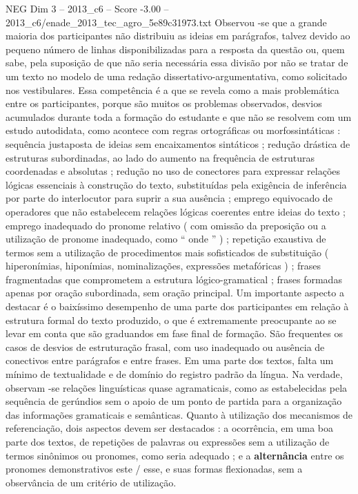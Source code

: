 \begin{textsample}{NEG Dim 3 – 2013\_c6 – Score -3.00 – 2013\_c6/enade\_2013\_tec\_agro\_5e89c31973.txt}
Observou -se que a grande maioria dos participantes não distribuiu as ideias em parágrafos, talvez devido ao pequeno número de linhas disponibilizadas para a resposta da questão ou, quem sabe, pela suposição de que não seria necessária essa divisão por não se tratar de um texto no modelo de uma redação dissertativo-argumentativa, como solicitado nos vestibulares.
Essa competência é a que se revela como a mais problemática entre os participantes, porque são muitos os problemas observados, desvios acumulados durante toda a formação do estudante e que não se resolvem com um estudo autodidata, como acontece com regras ortográficas ou morfossintáticas : sequência justaposta de ideias sem encaixamentos sintáticos ; redução drástica de estruturas subordinadas, ao lado do aumento na frequência de estruturas coordenadas e absolutas ; redução no uso de conectores para expressar relações lógicas essenciais à construção do texto, substituídas pela exigência de inferência por parte do interlocutor para suprir a sua ausência ; emprego equivocado de operadores que não estabelecem relações lógicas coerentes entre ideias do texto ; emprego inadequado do pronome relativo ( com omissão da preposição ou a utilização de pronome inadequado, como “ onde ” ) ; repetição exaustiva de termos sem a utilização de procedimentos mais sofisticados de substituição ( hiperonímias, hiponímias, nominalizações, expressões metafóricas ) ; frases fragmentadas que comprometem a estrutura lógico-gramatical ; frases formadas apenas por oração subordinada, sem oração principal.
Um importante aspecto a destacar é o baixíssimo desempenho de uma parte dos participantes em relação à estrutura formal do texto produzido, o que é extremamente preocupante ao se levar em conta que são graduandos em fase final de formação.
São frequentes os casos de desvios de estruturação frasal, com uso inadequado ou ausência de conectivos entre parágrafos e entre frases.
Em uma parte dos textos, falta um mínimo de textualidade e de domínio do registro padrão da língua.
Na verdade, observam -se relações linguísticas quase agramaticais, como as estabelecidas pela sequência de gerúndios sem o apoio de um ponto de partida para a organização das informações gramaticais e semânticas.
Quanto à utilização dos mecanismos de referenciação, dois aspectos devem ser destacados : a ocorrência, em uma boa parte dos textos, de repetições de palavras ou expressões sem a utilização de termos sinônimos ou pronomes, como seria adequado ; e a \textbf{alternância} entre os pronomes demonstrativos este / esse, e suas formas flexionadas, sem a observância de um critério de utilização.

\end{textsample}
